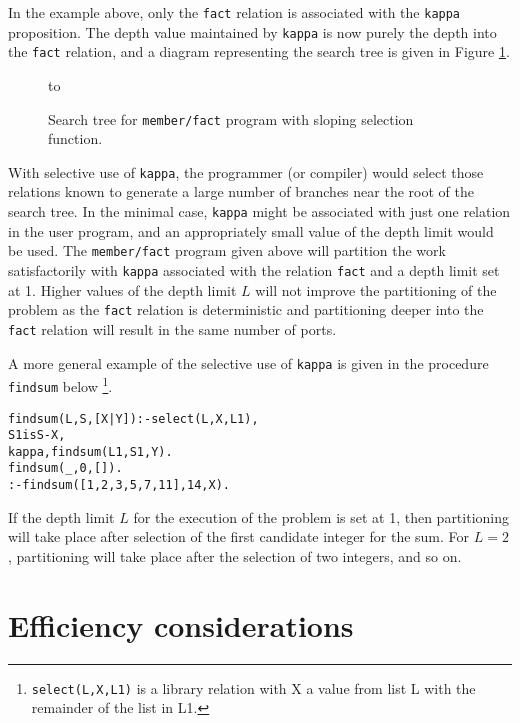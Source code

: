 In the example above, only the \texttt{fact} relation is associated with
the \texttt{kappa} proposition.  The depth value maintained by \texttt{kappa}
is now purely the depth into the \texttt{fact} relation, and a diagram
representing the search tree is given in Figure \ref{sloping_ports}.

\begin{figure}[htbp]
\vspace{5mm} \hbox to 
\caption{Search tree for \texttt{member/fact} program with sloping selection function.}
\vspace{5mm}
\label{sloping_ports}
\end{figure}

With selective use of \texttt{kappa}, the programmer (or compiler) would select those
relations known to generate a large number of branches near the root of the search
tree.  In the minimal case, \texttt{kappa} might be associated with just one relation in
the user program, and an appropriately small value of the depth limit would be used.
The \texttt{member/fact} program given above will partition the work satisfactorily with
\texttt{kappa} associated with the relation \texttt{fact} and a depth limit set at 1.
Higher values of the depth limit $L$ will not improve the partitioning of the problem
as the \texttt{fact} relation is deterministic and partitioning deeper into the
\texttt{fact} relation will result in the same number of ports.

A more general example of the selective use of \texttt{kappa} is given in the
procedure \texttt{findsum} below
\footnote{\texttt{select(L,X,L1)} is a library relation with X a value from list L
  with the remainder of the list in L1.}. 
\begin{alltt}
% L is given list of integers
% S is given sum
% [X|Y] is subset of L summing to S\vspace{2mm}
findsum(L,S,[X|Y]) :- select(L,X,L1),
                      S1 is S - X,
                      kappa, findsum(L1,S1,Y). 
findsum(_,0,[]).\vspace{2mm}
:- findsum([1,2,3,5,7,11],14, X).
\end{alltt}
If the depth limit $L$ for the execution of the problem is set at 1, then partitioning will
take place after selection of the first candidate integer for the sum.  For $L=2$,
partitioning will take place after the selection of two integers, and so on.

\section{Efficiency considerations} %

